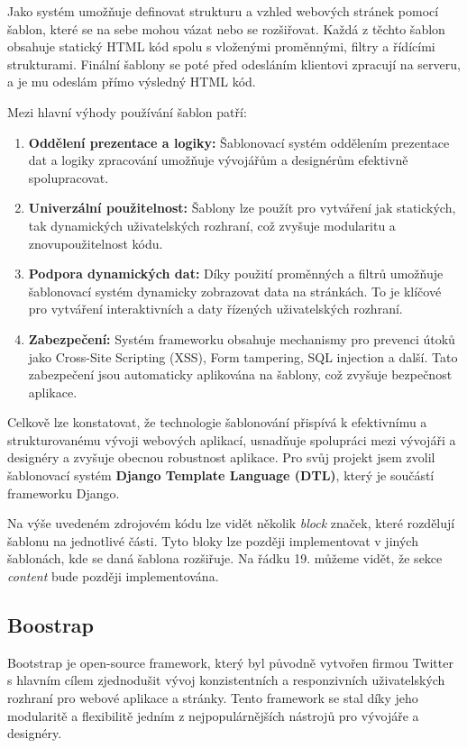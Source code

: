 Jako systém umožňuje definovat strukturu a vzhled webových stránek pomocí šablon, které se na sebe mohou vázat nebo se rozšiřovat. Každá z těchto šablon obsahuje statický HTML kód spolu s vloženými proměnnými, filtry a řídícími strukturami. Finální šablony se poté před odesláním klientovi zpracují na serveru, a je mu odeslám přímo výsledný HTML kód.

\noindent
Mezi hlavní výhody používání šablon patří:
\begin{enumerate}
    \item \textbf{Oddělení prezentace a logiky:} Šablonovací systém oddělením prezentace dat a logiky zpracování umožňuje vývojářům a designérům efektivně spolupracovat.
    \item \textbf{Univerzální použitelnost:} Šablony lze použít pro vytváření jak statických, tak dynamických uživatelských rozhraní, což zvyšuje modularitu a znovupoužitelnost kódu.
    \item \textbf{Podpora dynamických dat:} Díky použití proměnných a filtrů umožňuje šablonovací systém dynamicky zobrazovat data na stránkách. To je klíčové pro vytváření interaktivních a daty řízených uživatelských rozhraní.
    \item \textbf{Zabezpečení:} Systém frameworku obsahuje mechanismy pro prevenci útoků jako Cross-Site Scripting (XSS), Form tampering, SQL injection a další. Tato zabezpečení jsou automaticky aplikována na šablony, což zvyšuje bezpečnost aplikace.
\end{enumerate}

Celkově lze konstatovat, že technologie šablonování přispívá k efektivnímu a strukturovanému vývoji webových aplikací, usnadňuje spolupráci mezi vývojáři a designéry a zvyšuje obecnou robustnost aplikace. Pro svůj projekt jsem zvolil šablonovací systém \textbf{Django Template Language (DTL)}, který je součástí frameworku Django.



Na výše uvedeném zdrojovém kódu lze vidět několik \textit{block} značek, které rozdělují šablonu na jednotlivé části. Tyto bloky lze později implementovat v jiných šablonách, kde se daná šablona rozšiřuje. Na řádku 19. můžeme vidět, že sekce \textit{content} bude později implementována.

\subsection{Boostrap}
\label{subsec:dev-technology-bootstrap}
Bootstrap je open-source framework, který byl původně vytvořen firmou Twitter s hlavním cílem zjednodušit vývoj konzistentních a responzivních uživatelských rozhraní pro webové aplikace a stránky. Tento framework se stal díky jeho modularitě a flexibilitě jedním z nejpopulárnějších nástrojů pro vývojáře a designéry.

